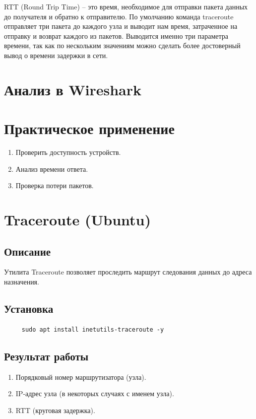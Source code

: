 RTT (Round Trip Time) – это время, необходимое для отправки пакета данных до
получателя и обратно к отправителю. По умолчанию команда traceroute отправляет три пакета
до каждого узла и выводит нам время, затраченное на отправку и возврат каждого из пакетов.
Выводится именно три параметра времени, так как по нескольким значениям можно сделать
более достоверный вывод о времени задержки в сети.

\section{Анализ в Wireshark}

\section{Практическое применение}

\begin{enumerate}
    \item Проверить доступность устройств.
    \item Анализ времени ответа.
    \item Проверка потери пакетов.
\end{enumerate}

\section{Traceroute (Ubuntu)}

\subsection{Описание}
Утилита Traceroute позволяет проследить маршрут следования данных до адреса
назначения.

\subsection{Установка}

\begin{lstlisting}
     sudo apt install inetutils-traceroute -y
\end{lstlisting}

\subsection{Результат работы}

\begin{enumerate}
    \item Порядковый номер маршрутизатора (узла).
    \item IP-адрес узла (в некоторых случаях с именем узла).
    \item RTT (круговая задержка).
\end{enumerate}

